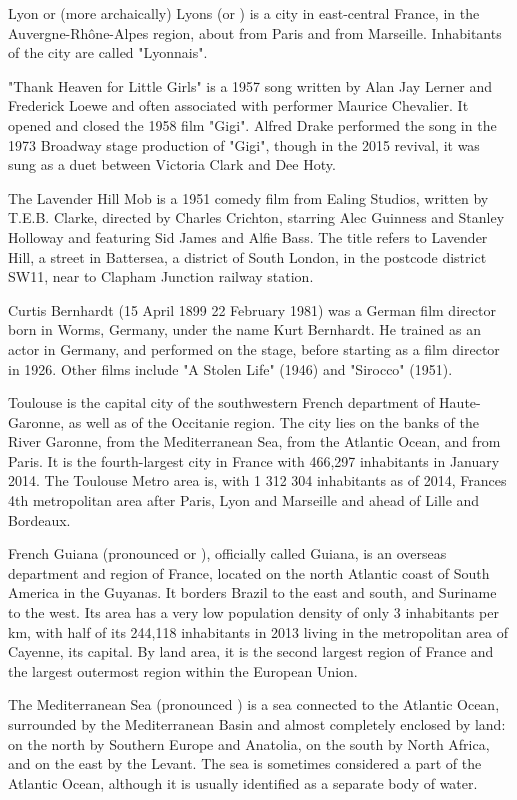 \documentclass{article} \usepackage{iclr2019_conference,times}
\begin{document}
Lyon or (more archaically) Lyons (or  ) is a city in east-central France, in the Auvergne-Rhône-Alpes region, about from Paris and from Marseille. Inhabitants of the city are called "Lyonnais".

"Thank Heaven for Little Girls" is a 1957 song written by Alan Jay Lerner and Frederick Loewe and often associated with performer Maurice Chevalier. It opened and closed the 1958 film "Gigi". Alfred Drake performed the song in the 1973 Broadway stage production of "Gigi", though in the 2015 revival, it was sung as a duet between Victoria Clark and Dee Hoty.

The Lavender Hill Mob is a 1951 comedy film from Ealing Studios, written by T.E.B. Clarke, directed by Charles Crichton, starring Alec Guinness and Stanley Holloway and featuring Sid James and Alfie Bass. The title refers to Lavender Hill, a street in Battersea, a district of South London, in the postcode district SW11, near to Clapham Junction railway station.

Curtis Bernhardt (15 April 1899  22 February 1981) was a German film director born in Worms, Germany, under the name Kurt Bernhardt. He trained as an actor in Germany, and performed on the stage, before starting as a film director in 1926. Other films include "A Stolen Life" (1946) and "Sirocco" (1951).

Toulouse is the capital city of the southwestern French department of Haute-Garonne, as well as of the Occitanie region. The city lies on the banks of the River Garonne, from the Mediterranean Sea, from the Atlantic Ocean, and from Paris. It is the fourth-largest city in France with 466,297 inhabitants in January 2014. 
The Toulouse Metro area is, with 1 312 304 inhabitants as of 2014, Frances 4th metropolitan area after Paris, Lyon and Marseille and ahead of Lille and Bordeaux.

French Guiana (pronounced or ), officially called Guiana, is an overseas department and region of France, located on the north Atlantic coast of South America in the Guyanas. It borders Brazil to the east and south, and Suriname to the west. Its area has a very low population density of only 3 inhabitants per km, with half of its 244,118 inhabitants in 2013 living in the metropolitan area of Cayenne, its capital. By land area, it is the second largest region of France and the largest outermost region within the European Union.

The Mediterranean Sea (pronounced ) is a sea connected to the Atlantic Ocean, surrounded by the Mediterranean Basin and almost completely enclosed by land: on the north by Southern Europe and Anatolia, on the south by North Africa, and on the east by the Levant. The sea is sometimes considered a part of the Atlantic Ocean, although it is usually identified as a separate body of water.
\end{document}
